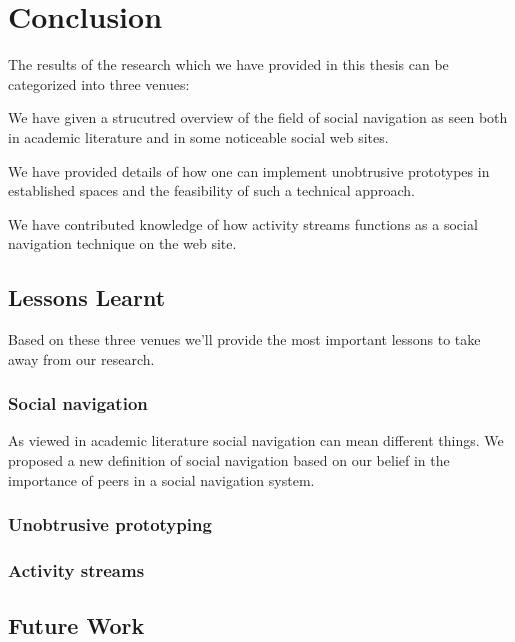 \chapter{Conclusion}
\label{chapter:conclusion}

The results of the research which we have provided in this thesis can be
categorized into three venues:

\begin{enum}
  \item We have given a strucutred overview of the field of social navigation
    as seen both in academic literature and in some noticeable social web
    sites.
  \item We have provided details of how one can implement unobtrusive
    prototypes in established spaces and the feasibility of such a technical
    approach.
  \item We have contributed knowledge of how activity streams functions as
    a social navigation technique on the \urort{} web site.
\end{enum}

\section{Lessons Learnt}

Based on these three venues we'll provide the most important lessons to take
away from our research.

\subsection{Social navigation}

As viewed in academic literature social navigation can mean different things.
We proposed a new definition of social navigation based on our belief in the
importance of peers in a social navigation system.%

\subsection{Unobtrusive prototyping}

\subsection{Activity streams}

\section{Future Work}


